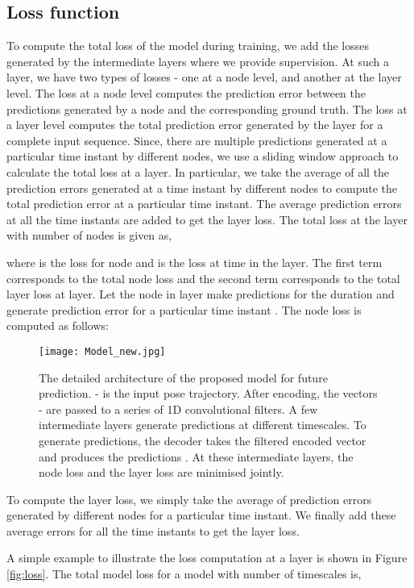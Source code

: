 \documentclass[conference]{IEEEtran}
\begin{document}
\subsection{Loss function}
To compute the total loss of the model during training, we add the losses generated by the intermediate layers where we provide supervision. At such a layer, we have two types of losses - one at a node level, and another at the layer level. The loss at a node level computes the prediction error between the predictions generated by a node and the corresponding ground truth. The loss at a layer level computes the total prediction error generated by the layer for a complete input sequence. Since, there are multiple predictions generated at a particular time instant by different nodes, we use a sliding window approach to calculate the total loss at a layer. In particular, we take the average of all the prediction errors generated at a time instant by different nodes to compute the total prediction error at a particular time instant. The average prediction errors at all the time instants are added to get the layer loss. The total loss at the  layer with  number of nodes is given as, 

where  is the loss for  node and  is the loss at time  in the  layer. The first term corresponds to the total node loss and the second term corresponds to the total layer loss at  layer. Let the  node in  layer make predictions for the duration  and generate prediction error  for a particular time instant . The  node loss is computed as follows:


\begin{figure*}
    \centering
    \texttt{[image: Model\_new.jpg]}
    \caption{The detailed architecture of the proposed model for future prediction. - is the input pose trajectory. After encoding, the vectors - are passed to a series of 1D convolutional filters. A few intermediate layers generate predictions at different timescales. To generate predictions, the decoder takes the filtered encoded vector and produces the predictions . At these intermediate layers, the node loss and the layer loss are minimised jointly.}
    \label{fig:model}
\end{figure*}

To compute the layer loss, we simply take the average of prediction errors generated by different nodes for a particular time instant. We finally add these average errors for all the time instants to get the layer loss.

A simple example to illustrate the loss computation at a layer is shown in Figure \ref{fig:loss}. The total model loss for a model with  number of timescales is,
\end{document}
